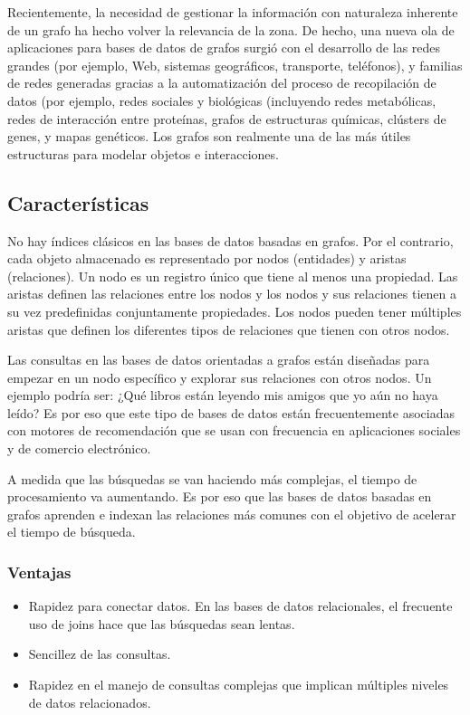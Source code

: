 	Recientemente, la necesidad de gestionar la información con naturaleza inherente de un grafo ha hecho volver la relevancia de la zona. De hecho, una nueva ola de aplicaciones para bases de datos de grafos surgió con el desarrollo de las redes grandes (por ejemplo, Web, sistemas geográficos, transporte, teléfonos), y familias de redes generadas gracias a la automatización del proceso de recopilación de datos (por ejemplo, redes sociales y biológicas (incluyendo redes metabólicas, redes de interacción entre proteínas, grafos de estructuras químicas, clústers de genes, y mapas genéticos. Los grafos son realmente una de las más útiles estructuras para modelar objetos e interacciones.\cite{8}

	\subsection{Características}
		No hay índices clásicos en las bases de datos basadas en grafos. Por el contrario, cada objeto almacenado es representado por nodos (entidades) y aristas (relaciones). Un nodo es un registro único que tiene al menos una propiedad. Las aristas definen las relaciones entre los nodos y los nodos y sus relaciones tienen a su vez predefinidas conjuntamente propiedades. Los nodos pueden tener múltiples aristas que definen los diferentes tipos de relaciones que tienen con otros nodos.

		Las consultas en las bases de datos orientadas a grafos están diseñadas para empezar en un nodo específico y explorar sus relaciones con otros nodos. Un ejemplo podría ser: ¿Qué libros están leyendo mis amigos que yo aún no haya leído? Es por eso que este tipo de bases de datos están frecuentemente asociadas con motores de recomendación que se usan con frecuencia en aplicaciones sociales y de comercio electrónico.

		A medida que las búsquedas se van haciendo más complejas, el tiempo de procesamiento va aumentando. Es por eso que las bases de datos basadas en grafos aprenden e indexan las relaciones más comunes con el objetivo de acelerar el tiempo de búsqueda. 
		\subsubsection{Ventajas}
		\begin{itemize}
		 \item Rapidez para conectar datos. En las bases de datos relacionales, el frecuente uso de joins hace que las búsquedas sean lentas.
		 \item Sencillez de las consultas.
		 \item Rapidez en el manejo de consultas complejas que implican múltiples niveles de datos relacionados.
		\end{itemize}
